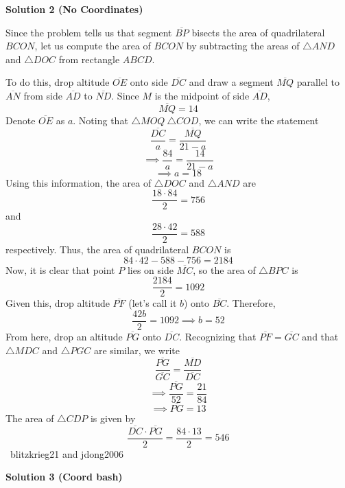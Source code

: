 \begin{enumerate}
 



\textbf{Solution 2 (No Coordinates)}

Since the problem tells us that segment $\overline{BP}$ bisects the area of quadrilateral $BCON$, let us compute the area of $BCON$ by subtracting the areas of $\triangle{AND}$ and $\triangle{DOC}$ from rectangle $ABCD$.

 To do this, drop altitude $\overline{OE}$ onto side $\overline{DC}$ and draw a segment $\overline{MQ}$ parallel to $\overline{AN}$ from side $\overline{AD}$ to $\overline{ND}$. Since $M$ is the midpoint of side $\overline{AD}$, 
 \[\overline{MQ}=14\] Denote $\overline{OE}$ as $a$. Noting that $\triangle{MOQ}~\triangle{COD}$, we can write the statement 
 \[\frac{\overline{DC}}{a}=\frac{\overline{MQ}}{21-a}\] 
 \[\implies \frac{84}{a}=\frac{14}{21-a}\] 
 \[\implies a=18\] Using this information, the area of $\triangle{DOC}$ and $\triangle{AND}$ are 
 \[\frac{18\cdot 84}{2}=756\] and 
 \[\frac{28\cdot 42}{2}=588\] respectively. Thus, the area of quadrilateral $BCON$ is 
 \[84\cdot 42-588-756=2184\] Now, it is clear that point $P$ lies on side $\overline{MC}$, so the area of $\triangle{BPC}$ is 
 \[\frac{2184}{2}=1092\] Given this, drop altitude $\overline{PF}$ (let's call it $b$) onto $\overline{BC}$. Therefore, 
 \[\frac{42b}{2}=1092\implies b=52\] From here, drop an altitude $\overline{PG}$ onto $\overline{DC}$. Recognizing that $\overline{PF}=\overline{GC}$ and that $\triangle{MDC}$ and $\triangle{PGC}$ are similar, we write 
 \[\frac{\overline{PG}}{\overline{GC}}=\frac{\overline{MD}}{\overline{DC}}\] 
 \[\implies \frac{\overline{PG}}{52}=\frac{21}{84}\] 
 \[\implies \overline{PG}=13\] The area of $\triangle{CDP}$ is given by 
 \[\frac{\overline{DC}\cdot \overline{PG}}{2}=\frac{84\cdot 13}{2}=\boxed{546}\] ~blitzkrieg21 and jdong2006

 



\textbf{Solution 3 (Coord bash)}


\end{enumerate}
